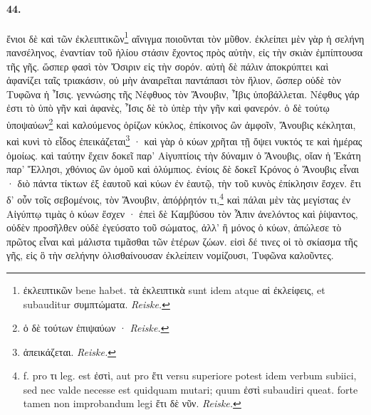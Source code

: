 \documentclass[a4paper, 11pt, oneside, polutonikogreek, german]{article}
\begin{document}
\paragraph{44.}
ἔνιοι δὲ καὶ τῶν ἐκλειπτικῶν\footnote{ἐκλειπτικῶν bene habet. τὰ ἐκλειπτικὰ sunt idem atque αἱ ἐκλείφεις, et subauditur συμπτώματα. \emph{Reiske.}} αἴνιγμα ποιοῦνται τὸν μῦθον. ἐκλείπει μὲν γὰρ ἡ σελήνη πανσέληνος, ἐναντίαν τοῦ ἡλίου στάσιν ἔχοντος πρὸς αὐτὴν, εἰς τὴν σκιὰν ἐμπίπτουσα τῆς γῆς. ὥσπερ φασὶ τὸν Ὄσιριν εἰς τὴν σορόν. αὐτὴ δὲ πάλιν ἀποκρύπτει καὶ ἀφανίζει ταῖς τριακάσιν, οὐ μὴν ἀναιρεῖται παντάπασι τὸν ἥλιον, ὥσπερ οὐδὲ τὸν Τυφῶνα ἡ Ἶσις. γεννώσης τῆς Νέφθυος τὸν Ἄνουβιν, Ἶβις ὑποβάλλεται. Νέφθυς γάρ ἐστι τὸ ὑπὸ γῆν καὶ ἀφανὲς, Ἶσις δὲ τὸ ὑπὲρ τὴν γῆν καὶ φανερόν. ὁ δὲ τούτῳ ὑποψαύων\footnote{ὁ δὲ τούτων ἐπιψαύων · \emph{Reiske.}} καὶ καλούμενος ὁρίζων κύκλος, ἐπίκοινος ὢν ἀμφοῖν, Ἄνουβις κέκληται, καὶ κυνὶ τὸ εἶδος ἐπεικάζεται\footnote{ἀπεικάζεται. \emph{Reiske.}} · καὶ γὰρ ὁ κύων χρῆται τῇ ὄψει νυκτός τε καὶ ἡμέρας ὁμοίως. καὶ ταύτην ἔχειν δοκεῖ παρ' Αἰγυπτίοις τὴν δύναμιν ὁ Ἄνουβις, οἵαν ἡ Ἑκάτη παρ' Ἕλλησι, χθόνιος ὢν ὁμοῦ καὶ ὀλύμπιος. ἐνίοις δὲ δοκεῖ Κρόνος ὁ Ἄνουβις εἶναι · διὸ πάντα τίκτων ἐξ ἑαυτοῦ καὶ κύων ἐν ἑαυτῷ, τὴν τοῦ κυνὸς ἐπίκλησιν ἔσχεν. ἔτι δ' οὖν τοῖς σεβομένοις, τὸν Ἄνουβιν, ἀπόῤῥητόν τι,\footnote{f. pro τι leg. est ἐστὶ, aut pro ἔτι versu superiore potest idem verbum subiici, sed nec valde necesse est quidquam mutari; quum ἐστὶ subaudiri queat. forte tamen non improbandum legi ἔτι δὲ νῦν. \emph{Reiske.}} καὶ πάλαι μὲν τὰς μεγίστας ἐν Αἰγύπτῳ τιμὰς ὁ κύων ἔσχεν · ἐπεὶ δὲ Καμβύσου τὸν Ἆπιν ἀνελόντος καὶ ῥίψαντος, οὐδὲν προσῆλθεν οὐδὲ ἐγεύσατο τοῦ σώματος, ἀλλ' ἢ μόνος ὁ κύων, ἀπώλεσε τὸ πρῶτος εἶναι καὶ μάλιστα τιμᾶσθαι τῶν ἑτέρων ζώων. εἰσὶ δέ τινες οἱ τὸ σκίασμα τῆς γῆς, εἰς ὃ τὴν σελήνην ὀλισθαίνουσαν ἐκλείπειν νομίζουσι, Τυφῶνα καλοῦντες.
\end{document}
